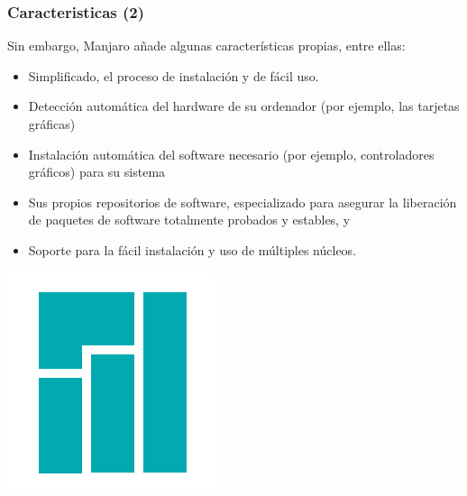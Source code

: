 \documentclass[9pt,t]{beamer}
\begin{document}
\begin{frame}\justifying
  \frametitle{Caracteristicas (2)}

	Sin embargo, Manjaro añade algunas características propias, entre ellas: 
	\begin{itemize}\justifying
	  \item Simplificado, el proceso de instalación y de fácil uso.
	  \item Detección automática del hardware de su ordenador (por ejemplo, las tarjetas gráficas) 
	  \item Instalación automática del software necesario (por ejemplo, controladores gráficos) para su sistema
	  \item Sus propios repositorios de software, especializado para asegurar la liberación de paquetes 
	  		de software totalmente probados y estables, y 
	  \item Soporte para la fácil instalación y uso de múltiples núcleos.
	\end{itemize}

	\begin{center}
      \includegraphics[height=0.20\textheight]{images/02_manjaroblue.png} \hspace*{0.0cm}
    \end{center}
\end{frame}
\end{document}
